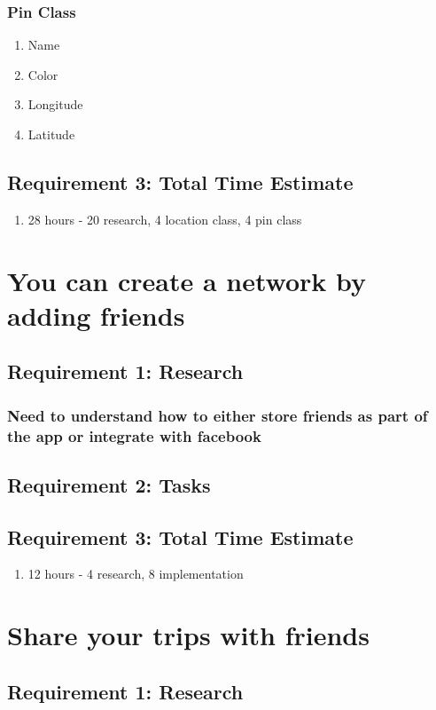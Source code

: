 \documentclass [10pt] {article}
\begin{document}
\subsubsection{Pin Class}
\begin{enumerate}
\item Name
\item Color
\item Longitude
\item Latitude
\end{enumerate}
\subsection{Requirement 3: Total Time Estimate}
\begin{enumerate}
\item 28 hours - 20 research, 4 location class, 4 pin class
\end{enumerate}

\section{You can create a network by adding friends}
\subsection{Requirement 1: Research}
\subsubsection{Need to understand how to either store friends as part of the app or integrate with facebook}
\subsection{Requirement 2: Tasks}
\subsection{Requirement 3: Total Time Estimate}
\begin{enumerate}
\item 12 hours - 4 research, 8 implementation
\end{enumerate}

\section{Share your trips with friends}
\subsection{Requirement 1: Research}
\end{document}

